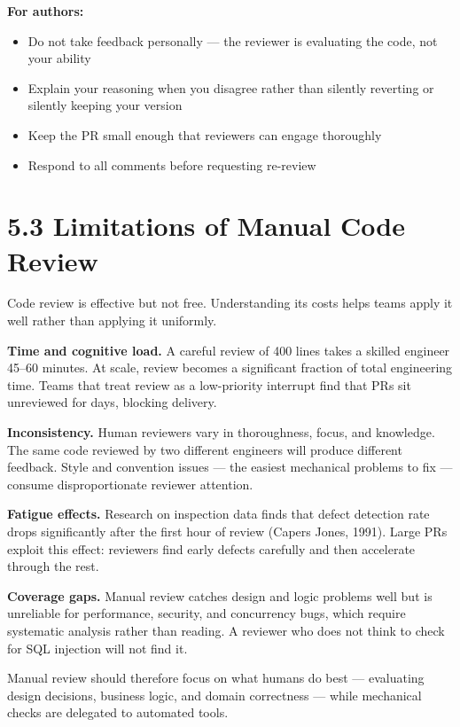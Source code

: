 \documentclass[11pt,a4paper]{book}
\begin{document}
\textbf{For authors:}
\begin{itemize}
  \item Do not take feedback personally --- the reviewer is evaluating the code, not your ability
  \item Explain your reasoning when you disagree rather than silently reverting or silently keeping your version
  \item Keep the PR small enough that reviewers can engage thoroughly
  \item Respond to all comments before requesting re-review
\end{itemize}

\medskip

\section{5.3 Limitations of Manual Code Review}

Code review is effective but not free. Understanding its costs helps teams apply it well rather than applying it uniformly.

\textbf{Time and cognitive load.} A careful review of 400 lines takes a skilled engineer 45--60 minutes. At scale, review becomes a significant fraction of total engineering time. Teams that treat review as a low-priority interrupt find that PRs sit unreviewed for days, blocking delivery.

\textbf{Inconsistency.} Human reviewers vary in thoroughness, focus, and knowledge. The same code reviewed by two different engineers will produce different feedback. Style and convention issues --- the easiest mechanical problems to fix --- consume disproportionate reviewer attention.

\textbf{Fatigue effects.} Research on inspection data finds that defect detection rate drops significantly after the first hour of review (Capers Jones, 1991). Large PRs exploit this effect: reviewers find early defects carefully and then accelerate through the rest.

\textbf{Coverage gaps.} Manual review catches design and logic problems well but is unreliable for performance, security, and concurrency bugs, which require systematic analysis rather than reading. A reviewer who does not think to check for SQL injection will not find it.

Manual review should therefore focus on what humans do best --- evaluating design decisions, business logic, and domain correctness --- while mechanical checks are delegated to automated tools.
\end{document}
